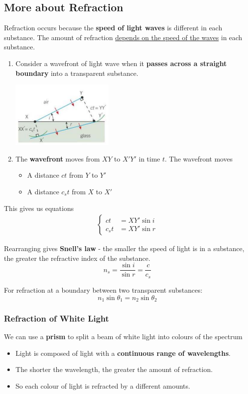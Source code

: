 \subsection{More about Refraction}

Refraction occurs because the \textbf{speed of light waves} is different in each substance. The amount of refraction \underline{depends on the speed of the waves} in each substance.

\begin{enumerate}
    \item Consider a wavefront of light wave when it \textbf{passes across a straight boundary} into a transparent substance.
        \begin{center}
            \includegraphics[width=5cm]{img/refraction}
        \end{center}
    \item The \textbf{wavefront} moves from $XY$ to $X'Y'$ in time $t$. The wavefront moves
        \begin{itemize}
            \item A distance $ct$ from $Y$ to $Y'$
            \item A distance $c_st$ from $X$ to $X'$
        \end{itemize}
\end{enumerate}
This gives us equations
\begin{align*}
    \begin{cases}
        ct&=XY'\sin i\\
        c_st&=XY'\sin r
    \end{cases}
\end{align*}

Rearranging gives \textbf{Snell's law} - the smaller the speed of light is in a substance, the greater the refractive index of the substance.
$$n_s=\frac{\sin i}{\sin r}=\frac{c}{c_s}$$

For refraction at a boundary between two transparent substances:
$$n_1\sin\theta_1=n_2\sin\theta_2$$

\subsubsection*{Refraction of White Light}
We can use a \textbf{prism} to split a beam of white light into colours of the spectrum
\begin{itemize}
    \item Light is composed of light with a \textbf{continuous range of wavelengths}.
    \item The shorter the wavelength, the greater the amount of refraction.
    \item So each colour of light is refracted by a different amounts.
\end{itemize}
